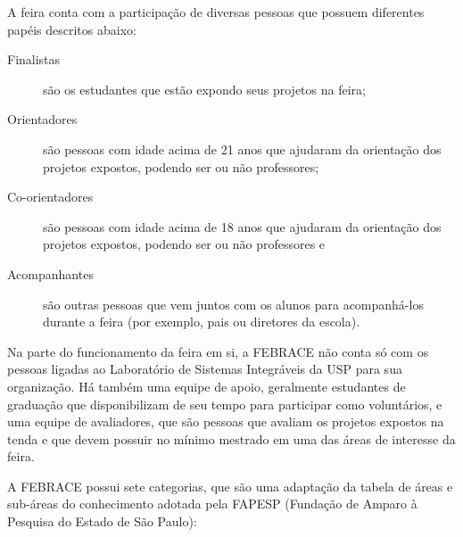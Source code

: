 A feira conta com a participação de diversas pessoas que possuem diferentes papéis descritos abaixo:

\begin{description}
    \item[Finalistas] 
        são os estudantes que estão expondo seus projetos na feira;
    \item[Orientadores] 
        são pessoas com idade acima de 21 anos que ajudaram da orientação dos projetos expostos, podendo ser ou não professores;
    \item[Co-orientadores] 
        são pessoas com idade acima de 18 anos que ajudaram da orientação dos projetos expostos, podendo ser ou não professores e
    \item[Acompanhantes] 
        são outras pessoas que vem juntos com os alunos para acompanhá-los durante a feira (por exemplo, pais ou diretores da escola).
\end{description}

Na parte do funcionamento da feira em si, a FEBRACE não conta só com os pessoas ligadas ao Laboratório de Sistemas Integráveis da USP para sua organização. Há também uma equipe de apoio, geralmente estudantes de graduação que disponibilizam de seu tempo para participar como voluntários, e uma equipe de avaliadores, que são pessoas que avaliam os projetos expostos na tenda e que devem possuir no mínimo mestrado em uma das áreas de interesse da feira.

A FEBRACE possui sete categorias, que são uma adaptação da tabela de áreas e sub-áreas do conhecimento adotada pela FAPESP (Fundação de Amparo à Pesquisa do Estado de São Paulo):

